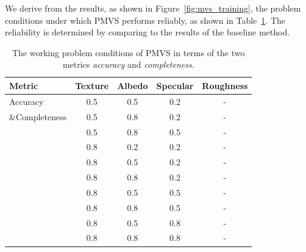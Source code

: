 


We derive from the results, as shown in Figure~\ref{fig:mvs_training}, the problem conditions under which PMVS performs reliably, as shown in Table~\ref{tab:mvs_training_result}. The reliability is determined by comparing to the results of the baseline method.
\begin{table}[!htbp]
  \centering
  \begin{tabular}{l*{4}{c}}
  \toprule
  \textbf{Metric} & Texture & Albedo & Specular & Roughness\\
  \midrule
  Accuracy & 0.5 & 0.5 & 0.2 & -\\
  \&Completeness & 0.5 & 0.8 & 0.2 & -\\
           & 0.5 & 0.8 & 0.5 & -\\
           & 0.8 & 0.2 & 0.2 & -\\
           & 0.8 & 0.5 & 0.2 & -\\
           & 0.8 & 0.8 & 0.2 & -\\
           & 0.8 & 0.5 & 0.5 & -\\
           & 0.8 & 0.8 & 0.5 & -\\
           & 0.8 & 0.5 & 0.8 & -\\
           & 0.8 & 0.8 & 0.8 & -\\
  \bottomrule
  \end{tabular}
  \caption{The working problem conditions of PMVS in terms of the two metrics \textit{accuracy} and \textit{completeness}.}
  \label{tab:mvs_training_result}
\end{table}

